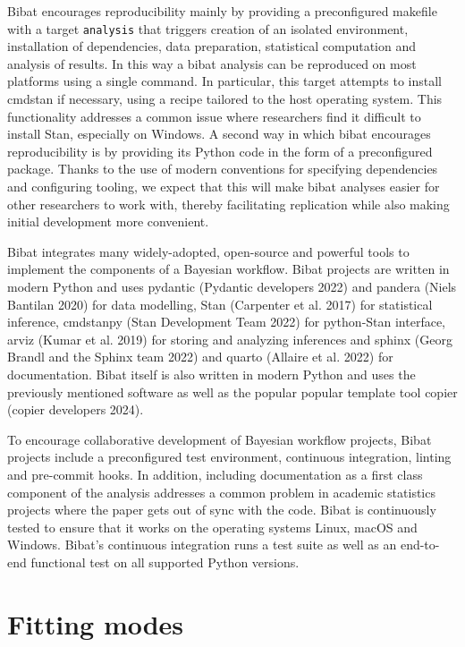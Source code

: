 \documentclass[
  letterpaper,
  DIV=11,
  numbers=noendperiod]{scrartcl}
\begin{document}
Bibat encourages reproducibility mainly by providing a preconfigured
makefile with a target \texttt{analysis} that triggers creation of an
isolated environment, installation of dependencies, data preparation,
statistical computation and analysis of results. In this way a bibat
analysis can be reproduced on most platforms using a single command. In
particular, this target attempts to install cmdstan if necessary, using
a recipe tailored to the host operating system. This functionality
addresses a common issue where researchers find it difficult to install
Stan, especially on Windows. A second way in which bibat encourages
reproducibility is by providing its Python code in the form of a
preconfigured package. Thanks to the use of modern conventions for
specifying dependencies and configuring tooling, we expect that this
will make bibat analyses easier for other researchers to work with,
thereby facilitating replication while also making initial development
more convenient.

Bibat integrates many widely-adopted, open-source and powerful tools to
implement the components of a Bayesian workflow. Bibat projects are
written in modern Python and uses pydantic (Pydantic developers 2022)
and pandera (Niels Bantilan 2020) for data modelling, Stan (Carpenter et
al. 2017) for statistical inference, cmdstanpy (Stan Development Team
2022) for python-Stan interface, arviz (Kumar et al. 2019) for storing
and analyzing inferences and sphinx (Georg Brandl and the Sphinx team
2022) and quarto (Allaire et al. 2022) for documentation. Bibat itself
is also written in modern Python and uses the previously mentioned
software as well as the popular popular template tool copier (copier
developers 2024).

To encourage collaborative development of Bayesian workflow projects,
Bibat projects include a preconfigured test environment, continuous
integration, linting and pre-commit hooks. In addition, including
documentation as a first class component of the analysis addresses a
common problem in academic statistics projects where the paper gets out
of sync with the code. Bibat is continuously tested to ensure that it
works on the operating systems Linux, macOS and Windows. Bibat's
continuous integration runs a test suite as well as an end-to-end
functional test on all supported Python versions.

\section{Fitting modes}\label{fitting-modes}
\end{document}
